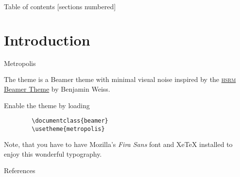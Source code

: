 \documentclass[12pt]{beamer}
\begin{document}
  \maketitle

  \begin{frame}{Table of contents}
    [sections numbered]
    \tableofcontents[hideallsubsections]
  \end{frame}

  \section{Introduction}

    \begin{frame}[fragile]{Metropolis}

      The \themename theme is a Beamer theme with minimal visual noise
      inspired by the \href{https://github.com/hsrmbeamertheme/hsrmbeamertheme}{\textsc{hsrm} Beamer
      Theme} by Benjamin Weiss.

      Enable the theme by loading

      \begin{verbatim}
        \documentclass{beamer}
        \usetheme{metropolis}
      \end{verbatim}

      Note, that you have to have Mozilla's \emph{Fira Sans} font and XeTeX
      installed to enjoy this wonderful typography.
    \end{frame}

    \begin{frame}[allowframebreaks]{References}

      
      

    \end{frame}
\end{document}
